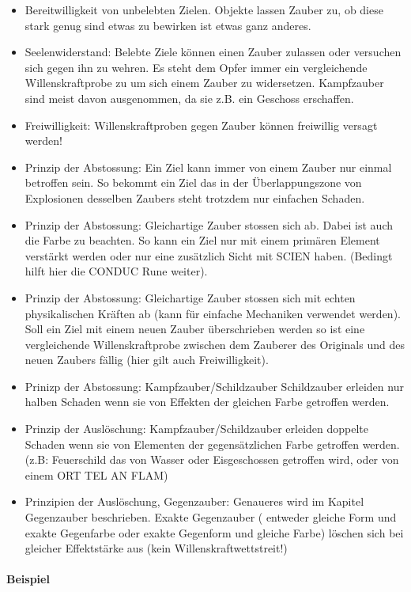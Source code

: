\documentclass{article}
\begin{document}
\begin{itemize}
\item Bereitwilligkeit von unbelebten Zielen. Objekte lassen Zauber zu, ob diese stark genug sind etwas zu bewirken ist etwas ganz anderes.
\item Seelenwiderstand: Belebte Ziele können einen Zauber zulassen oder versuchen sich gegen ihn zu wehren. Es steht dem Opfer immer ein vergleichende Willenskraftprobe zu um sich einem Zauber zu widersetzen. Kampfzauber sind meist davon ausgenommen, da sie z.B. ein Geschoss erschaffen.
\item Freiwilligkeit: Willenskraftproben gegen Zauber können freiwillig versagt werden!
\item Prinzip der Abstossung: Ein Ziel kann immer von einem Zauber nur einmal betroffen sein. So bekommt ein Ziel das in der Überlappungszone von Explosionen desselben Zaubers steht trotzdem nur einfachen Schaden.
\item Prinzip der Abstossung: Gleichartige Zauber stossen sich ab. Dabei ist auch die Farbe zu beachten. So kann ein Ziel nur mit einem primären Element verstärkt werden oder nur eine zusätzlich Sicht mit SCIEN haben. (Bedingt hilft hier die CONDUC Rune weiter).
\item Prinzip der Abstossung: Gleichartige Zauber stossen sich mit echten physikalischen Kräften ab (kann für einfache Mechaniken verwendet werden). Soll ein Ziel mit einem neuen Zauber überschrieben werden so ist eine vergleichende Willenskraftprobe zwischen dem Zauberer des Originals und des neuen Zaubers fällig (hier gilt auch Freiwilligkeit).
\item Prinizp der Abstossung: Kampfzauber/Schildzauber Schildzauber erleiden nur halben Schaden wenn sie von Effekten der gleichen Farbe getroffen werden.
\item Prinzip der Auslöschung: Kampfzauber/Schildzauber erleiden doppelte Schaden wenn sie von Elementen der gegensätzlichen Farbe getroffen werden. (z.B: Feuerschild das von Wasser oder Eisgeschossen getroffen wird, oder von einem ORT TEL AN FLAM)
\item Prinzipien der Auslöschung, Gegenzauber: Genaueres wird im Kapitel Gegenzauber beschrieben. Exakte Gegenzauber ( entweder gleiche Form und exakte Gegenfarbe oder exakte Gegenform und gleiche Farbe) löschen sich bei gleicher Effektstärke aus (kein Willenskraftwettstreit!)
\end{itemize}

\paragraph{Beispiel}
\end{document}
